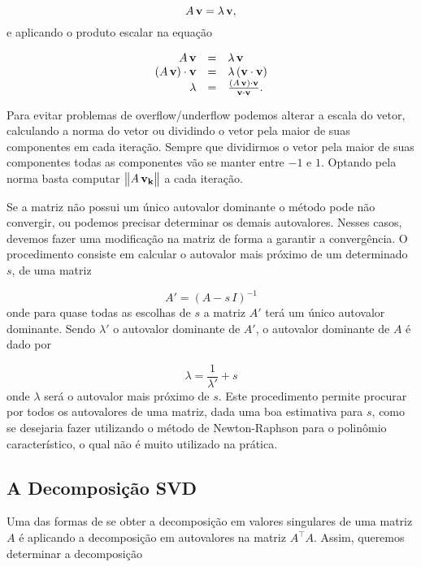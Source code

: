\begin{equation*}
A\,{\bf v}=\lambda\,{\bf v},
\end{equation*}
e aplicando o produto escalar na equação

\begin{equation*}
\begin{array}{rcl}
A\,{\bf v}&=&\lambda\,{\bf v}\\
(A\,{\bf v})\cdot{\bf v}&=&\lambda\,({\bf v}\cdot{\bf v})\\
\lambda&=&\frac{(A\,{\bf v})\cdot{\bf v}}{{\bf v}\cdot{\bf v}}.
\end{array}
\end{equation*}

Para evitar problemas de overflow/underflow podemos alterar a escala do vetor, calculando a norma do vetor ou dividindo o vetor pela maior de suas componentes em cada iteração. Sempre que dividirmos o vetor pela maior de suas componentes todas as componentes vão se manter entre $-1$ e $1$. Optando pela norma basta computar $\begin{Vmatrix}A\,{\bf v_k}\end{Vmatrix}$ a cada iteração. 


Se a matriz não possui um único autovalor dominante o método pode não convergir, ou podemos precisar determinar os demais autovalores. Nesses casos, devemos fazer uma modificação na matriz de forma a garantir a convergência. O procedimento consiste em calcular o autovalor mais próximo de um determinado $s$, de uma matriz

\begin{equation*}
A'=(A-s\,I)^{-1}
\end{equation*}
onde para quase todas as escolhas de $s$ a matriz $A'$ terá um único autovalor dominante. Sendo $\lambda'$ o autovalor dominante de $A'$, o autovalor dominante de $A$ é dado por

\begin{equation*}
\lambda=\frac{1}{\lambda'}+s
\end{equation*} 
onde $\lambda$ será o autovalor mais próximo de $s$. Este procedimento permite procurar por todos os autovalores de uma matriz, dada uma boa estimativa para $s$, como se desejaria fazer utilizando o método de Newton-Raphson para o polinômio característico, o qual não é muito utilizado na prática.

\subsection{A Decomposição SVD}\label{sec.SVD}
Uma das formas de se obter a decomposição em valores singulares de uma matriz $A$ é aplicando a decomposição em autovalores na matriz  $A^\top A$. Assim, queremos determinar a decomposição

